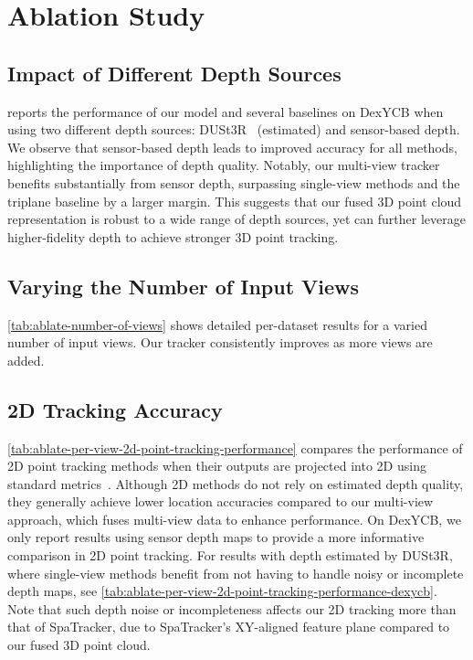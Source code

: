 \section{Ablation Study} \label{app:sub:ablation}

\subsection{Impact of Different Depth Sources}
 reports the performance of our model and several baselines on DexYCB when using two different depth sources: DUSt3R~\cite{wang2024dust3r} (estimated) and sensor-based depth. We observe that sensor-based depth leads to improved accuracy for all methods, highlighting the importance of depth quality. Notably, our multi-view tracker benefits substantially from sensor depth, surpassing single-view methods and the triplane baseline by a larger margin. This suggests that our fused 3D point cloud representation is robust to a wide range of depth sources, yet can further leverage higher-fidelity depth to achieve stronger 3D point tracking.



\subsection{Varying the Number of Input Views}
\label{sec:number-of-views-details}
\cref{tab:ablate-number-of-views} shows detailed per-dataset results for a varied number of input views. Our tracker consistently improves as more views are added.



\subsection{2D Tracking Accuracy} 

\cref{tab:ablate-per-view-2d-point-tracking-performance} compares the performance of 2D point tracking methods when their outputs are projected into 2D using standard metrics~\cite{doersch2023tapvid}. Although 2D methods do not rely on estimated depth quality, they generally achieve lower location accuracies compared to our multi-view approach, which fuses multi-view data to enhance performance. On DexYCB, we only report results using sensor depth maps to provide a more informative comparison in 2D point tracking. For results with depth estimated by DUSt3R, where single-view methods benefit from not having to handle noisy or incomplete depth maps, see \cref{tab:ablate-per-view-2d-point-tracking-performance-dexycb}. Note that such depth noise or incompleteness affects our 2D tracking more than that of SpaTracker, due to SpaTracker’s XY-aligned feature plane compared to our fused 3D point cloud.

